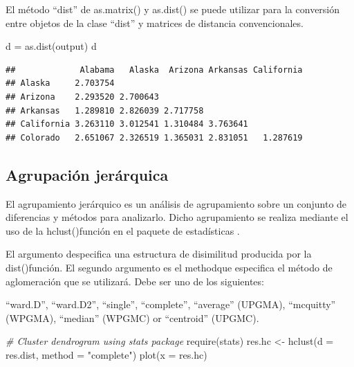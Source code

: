 \documentclass[
]{article}
\newenvironment{Shaded}{\begin{snugshade}}{\end{snugshade}}
\newcommand{\AttributeTok}[1]{\textcolor[rgb]{0.77,0.63,0.00}{#1}}
\newcommand{\CommentTok}[1]{\textcolor[rgb]{0.56,0.35,0.01}{\textit{#1}}}
\newcommand{\FunctionTok}[1]{\textcolor[rgb]{0.00,0.00,0.00}{#1}}
\newcommand{\NormalTok}[1]{#1}
\newcommand{\OtherTok}[1]{\textcolor[rgb]{0.56,0.35,0.01}{#1}}
\newcommand{\StringTok}[1]{\textcolor[rgb]{0.31,0.60,0.02}{#1}}
\begin{document}
El método ``dist'' de as.matrix() y as.dist() se puede utilizar para la
conversión entre objetos de la clase ``dist'' y matrices de distancia
convencionales.

\begin{Shaded}
\begin{Highlighting}[]
\NormalTok{d }\OtherTok{=} \FunctionTok{as.dist}\NormalTok{(output)}
\NormalTok{d}
\end{Highlighting}
\end{Shaded}

\begin{verbatim}
##             Alabama   Alaska  Arizona Arkansas California
## Alaska     2.703754                                      
## Arizona    2.293520 2.700643                             
## Arkansas   1.289810 2.826039 2.717758                    
## California 3.263110 3.012541 1.310484 3.763641           
## Colorado   2.651067 2.326519 1.365031 2.831051   1.287619
\end{verbatim}

\hypertarget{agrupaciuxf3n-jeruxe1rquica}{%
\subsection{Agrupación jerárquica}\label{agrupaciuxf3n-jeruxe1rquica}}

El agrupamiento jerárquico es un análisis de agrupamiento sobre un
conjunto de diferencias y métodos para analizarlo. Dicho agrupamiento se
realiza mediante el uso de la hclust()función en el paquete de
estadísticas .

El argumento despecifica una estructura de disimilitud producida por la
dist()función. El segundo argumento es el methodque especifica el método
de aglomeración que se utilizará. Debe ser uno de los siguientes:

``ward.D'', ``ward.D2'', ``single'', ``complete'', ``average'' (UPGMA),
``mcquitty'' (WPGMA), ``median'' (WPGMC) or ``centroid'' (UPGMC).

\begin{Shaded}
\begin{Highlighting}[]
\CommentTok{\# Cluster dendrogram using stats package}
\FunctionTok{require}\NormalTok{(stats)}
\NormalTok{res.hc }\OtherTok{\textless{}{-}} \FunctionTok{hclust}\NormalTok{(}\AttributeTok{d =}\NormalTok{ res.dist,}
                 \AttributeTok{method =} \StringTok{"complete"}\NormalTok{)}
\FunctionTok{plot}\NormalTok{(}\AttributeTok{x =}\NormalTok{ res.hc)}
\end{Highlighting}
\end{Shaded}
\end{document}
